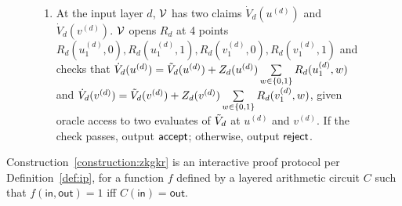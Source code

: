 \begin{figure}[H]
{{{{\begin{construction}
\begin{enumerate}
\begin{enumerate}
	\item At the end of the zero-knowledge sumcheck protocol, $\P$ sends $\V$ $\dot{V}_{i+1}(u^{(i+1)})$ and $\dot{V}_{i+1}(v^{(i+1)})$.
	
	\item $\V$ computes $a_{i+1} = \alpha^{(i)}\tilde{mult}_{i+1}(u^{(i)}, u^{(i+1)}, v^{(i+1)})+\beta^{(i)}\tilde{mult}_{i+1}(v^{(i)}, u^{(i+1)}, v^{(i+1)})$ and $b_{i+1} = \alpha^{(i)}\tilde{add}_{i+1}(u^{(i)}, u^{(i+1)}, v^{(i+1)})+\beta^{(i)}\tilde{add}_{i+1}(v^{(i)}, u^{(i+1)}, v^{(i+1)})$ locally. $\V$ computes $Z_i(u^{(i)}),Z_i(v^{(i)}),I(\vec{0},c^{(i)}), I((u^{(i+1)},v^{(i+1)}),\vec{0})$ locally.
	\item $\P$ and $\V$ open $R_i$ at two points $R_i(u_1^{(i)},c^{(i)})$ and $R_i(v_1^{(i)},c^{(i)})$ using $\Open$ and $\Verify$.
	\item $\V$ computes the following as the evaluation oracle and uses it to complete the last step of the zero-knowledge sumcheck.
	\begin{align*}
		I(\vec{0},c^{(i)})(a_{i+1}(\dot{V}_{i+1}(u^{(i+1)})\dot{V}_{i+1}(v^{(i+1)}))+b_{i+1}(\dot{V}_{i+1}(u^{(i+1)})+\dot{V}_{i+1}(v^{(i+1)})))\\
		+I((u^{(i+1)},v^{(i+1)}),\vec{0})(\alpha^{(i)}Z_i(u^{(i)})R_i(u_1^{(i)}, c^{(i)})+\beta^{(i)}Z_i(v^{(i)})R_i(v_1^{(i)}, c^{(i)}))
	\end{align*}
	If all checks in the zero knowledge sumcheck and $\Verify$ passes, $\V$ uses $\dot{V}_{i+1}(u^{(i+1)})$ and $\dot{V}_{i+1}(v^{(i+1)})$ to proceed to the $(i+1)$-th layer. Otherwise, $\V$ outputs $\reject$ and aborts.
	
	\end{enumerate}

\item At the input layer $d$, $\V$ has two claims $\dot{V}_{d}(u^{(d)})$ and $\dot{V}_{d}(v^{(d)})$. $\V$ opens $R_d$ at 4 points $R_d(u_1^{(d)},0),R_d(u_1^{(d)},1),R_d(v_1^{(d)},0),R_d(v_1^{(d)},1)$ and checks that $\dot{V}_{d}(u^{(d)}) = \tilde{V}_d(u^{(d)})+Z_d(u^{(d)})\sum\limits_{w \in \{0,1\}}R_d(u_1^{(d)},w)$ and $\dot{V}_{d}(v^{(d)}) = \tilde{V}_d(v^{(d)})+Z_d(v^{(d)})\sum\limits_{w \in \{0,1\}}R_d(v_1^{(d)},w)$, given oracle access to two evaluates of $\tilde{V}_d$ at $u^{(d)}$ and $v^{(d)}$. If the check passes, output $\mathsf{accept}$; otherwise, output $\reject$.

\end{enumerate}
\end{construction}}}}}
\end{figure}
\begin{theorem}
	Construction~\ref{construction:zkgkr} is an interactive proof protocol per Definition~\ref{def:ip}, for a function $f$ defined by a layered arithmetic circuit $C$ such that $f(\mathsf{in},\mathsf{out}) = 1$ iff $C(\mathsf{in}) = \mathsf{out}$.
\end{theorem}


